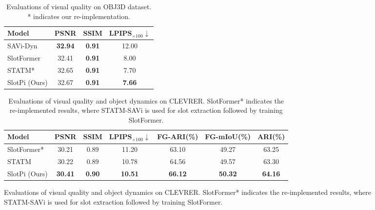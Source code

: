 \documentclass[sigconf]{acmart}
\begin{document}
\begin{figure}[htbp]
\centering
\begin{minipage}{0.4\textwidth}
\begin{table}[H]
\caption{Evaluations of visual quality on OBJ3D dataset. * indicates our re-implementation.}
\label{tab4-1}
\vspace{-6pt}
\begin{tabular}{lccc}
\toprule
{\bf Model}&\small {\bf PSNR}&\small {\bf SSIM}&\small {\bf LPIPS$_{\times 100}$}$\downarrow$\\
\midrule
SAVi-Dyn&\textbf{32.94}&\textbf{0.91}&12.00\\
SlotFormer&32.41&\textbf{0.91}&8.00\\
STATM*&32.65&\textbf{0.91}&7.70\\
SlotPi (Ours)&32.67&\textbf{0.91}&\textbf{7.66}\\
\bottomrule
\end{tabular}
\vspace{-6pt}
\end{table}
\end{minipage}%
\hfill
\begin{minipage}{0.58\textwidth}
\begin{table}[H]
\caption{Evaluations of visual quality and object dynamics on CLEVRER. SlotFormer*
indicates the re-implemented results, where STATM-SAVi is used for slot extraction followed by training SlotFormer.}
\label{tab4-2}
\vspace{-6pt}
\begin{tabular}{lcccccc}
\toprule
{\bf Model}&\small {\bf PSNR}&\small {\bf SSIM}&\small {\bf LPIPS$_{\times 100}$}$\downarrow$&\small {\bf FG-ARI}\textsf{(\%)}&\small {\bf FG-mIoU}\textsf{(\%)}&\small {\bf ARI}\textsf{(\%)}\\
\midrule
SlotFormer*&30.21&0.89&11.20&63.10&49.27&63.25\\
STATM&30.22&0.89&10.78&64.56&49.57&63.30\\
SlotPi (Ours)&\textbf{30.41}&\textbf{0.90}&\textbf{10.51}&\textbf{66.12}&\textbf{50.32}&\textbf{64.16}\\
\bottomrule
\end{tabular}
\end{table}
\end{minipage}
\end{figure}
\end{document}
